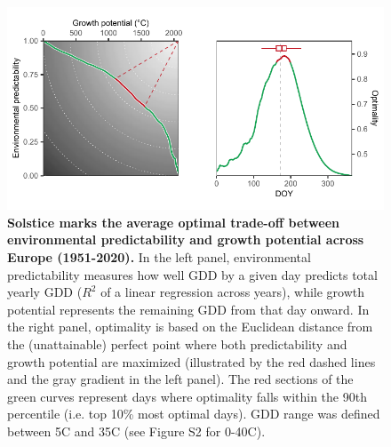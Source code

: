 \documentclass[11pt,letter]{article}
\begin{document}
\begin{figure}[h]
\centering
\includegraphics{global_optimality.pdf}
\vspace*{-0.5cm}
\caption{\textbf{Solstice marks the average optimal trade-off between environmental predictability and growth potential across Europe (1951-2020).} In the left panel, environmental predictability measures how well GDD by a given day predicts total yearly GDD ($R^2$ of a linear regression across years), while growth potential represents the remaining GDD from that day onward. In the right panel, optimality is based on the Euclidean distance from the (unattainable) perfect point where both predictability and growth potential are maximized (illustrated by the red dashed lines and the gray gradient in the left panel). The red sections of the green curves represent days where optimality falls within the 90th percentile (i.e. top 10\% most optimal days). GDD range was defined between 5\degree C and 35\degree C (see Figure S2 for 0-40\degree C).} 
\label{fig:globaloptimality}
\end{figure}
\end{document}
